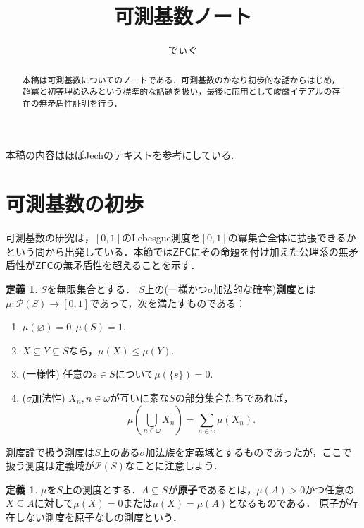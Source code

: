 \documentclass[uplatex]{jsarticle}
\title{可測基数ノート}
\author{でぃぐ}
\newcommand{\Pow}{\mathcal{P}}
\newcommand{\ZFC}{\mathsf{ZFC}}
\renewcommand\emptyset{\varnothing}
\renewcommand\subset{\subseteq}
\theoremstyle{definition}
\newtheorem{defi}[thm]{定義}
\begin{document}
	
	\maketitle
	
	\begin{abstract}
		本稿は可測基数についてのノートである．可測基数のかなり初歩的な話からはじめ，超冪と初等埋め込みという標準的な話題を扱い，最後に応用として峻厳イデアルの存在の無矛盾性証明を行う．
	\end{abstract}
	
	\tableofcontents
	
	\vspace{1cm}
	
	本稿の内容はほぼJechのテキスト\cite{jech2006set}を参考にしている.
	
	\section{可測基数の初歩}
	
	可測基数の研究は，$[0, 1]$のLebesgue測度を$[0, 1]$の冪集合全体に拡張できるかという問から出発している．本節では$\ZFC$にその命題を付け加えた公理系の無矛盾性が$\ZFC$の無矛盾性を超えることを示す．
	
	\begin{defi}
		$S$を無限集合とする． $S$上の(一様かつ$\sigma$加法的な確率)\textbf{測度}とは$\mu \colon \Pow(S) \to [0, 1]$であって，次を満たすものである：
		\begin{enumerate}
			\item $\mu(\emptyset) = 0, \mu(S) = 1$.
			\item $X \subset Y \subset S$なら，$\mu(X) \le \mu(Y)$.
			\item (一様性) 任意の$s \in S$について$\mu(\{s\}) = 0$.
			\item ($\sigma$加法性) $X_n, n \in \omega$が互いに素な$S$の部分集合たちであれば，
			\[
			\mu\left(\bigcup_{n \in \omega} X_n\right) = \sum_{n \in \omega} \mu(X_n). 
			\]
		\end{enumerate}
	\end{defi}
	
	測度論で扱う測度は$S$上のある$\sigma$加法族を定義域とするものであったが，ここで扱う測度は定義域が$\Pow(S)$なことに注意しよう．
	
	\begin{defi}
		$\mu$を$S$上の測度とする．$A \subset S$が\textbf{原子}であるとは，$\mu(A) > 0$かつ任意の$X \subset A$に対して$\mu(X) = 0$または$\mu(X) = \mu(A)$となるものである．
		原子が存在しない測度を原子なしの測度という．
	\end{defi}
	
\end{document}
